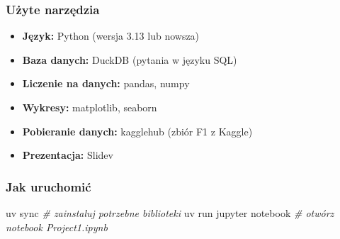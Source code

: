 \documentclass[
]{article}
\newenvironment{Shaded}{}{}
\newcommand{\CommentTok}[1]{\textcolor[rgb]{0.38,0.63,0.69}{\textit{#1}}}
\newcommand{\ExtensionTok}[1]{#1}
\newcommand{\NormalTok}[1]{#1}
\providecommand{\tightlist}{%
\setlength{\itemsep}{0pt}\setlength{\parskip}{0pt}}
\begin{document}
\subsubsection{Użyte narzędzia}\label{uux17cyte-narzux119dzia}

\begin{itemize}
    \tightlist
  \item
    \textbf{Język:} Python (wersja 3.13 lub nowsza)
  \item
    \textbf{Baza danych:} DuckDB (pytania w języku SQL)
  \item
    \textbf{Liczenie na danych:} pandas, numpy
  \item
    \textbf{Wykresy:} matplotlib, seaborn
  \item
    \textbf{Pobieranie danych:} kagglehub (zbiór F1 z Kaggle)
  \item
    \textbf{Prezentacja:} Slidev
\end{itemize}

\subsubsection{Jak uruchomić}\label{jak-uruchomiux107}

\begin{Shaded}
  \begin{Highlighting}[]
    \ExtensionTok{uv}\NormalTok{ sync                       }\CommentTok{\# zainstaluj potrzebne biblioteki}
    \ExtensionTok{uv}\NormalTok{ run jupyter notebook       }\CommentTok{\# otwórz notebook Project1.ipynb}
  \end{Highlighting}
\end{Shaded}
\end{document}
